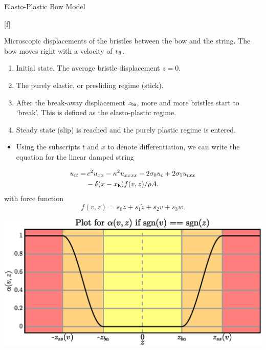 \documentclass[a0paper,portrait]{baposter}
\let\oldtext\text
\renewcommand{\text}[1]{\oldtext{\fontfamily{ptm}\selectfont #1}}
\begin{document}
\begin{poster}
\begin{posterbox}[name=elasto,column=0,below=intro]{Elasto-Plastic Bow Model}
\begin{center}
\begin{tikzpicture}[scale=0.84, every node/.style={transform shape}]
    \end{tikzpicture}
    \captionsetup{singlelinecheck=off}
    [f]{%
    Microscopic displacements of the bristles between the bow and the string. The bow moves right with a velocity of $v_\text{B}$.
    \begin{enumerate}[label = \alph*)]
        \item Initial state. The average bristle displacement $z=0$. 
        \item The purely elastic, or presliding regime (stick).
        \item After the break-away displacement $z_\text{ba}$, more and more bristles start to `break'. This is defined as the elasto-plastic regime. 
        \item Steady state (slip) is reached and the purely plastic regime is entered.
    \end{enumerate}
}
    \label{fig:elasto}
    \end{center}
    \begin{itemize}
        \item Using the subscripts $t$ and $x$ to denote differentiation, we can write the equation for the linear damped string
    \end{itemize}
    \begin{equation}
\begin{aligned}
  u_{tt} = &\, c^2u_{xx}-\kappa^2u_{xxxx}-2\sigma_0u_t+2\sigma_1u_{txx}\\
  &-\delta(x-x_\text{B})f(v,z)/\rho A.
  \end{aligned}
\end{equation}
with force function
\begin{equation}
    f(v,z) = s_0z+s_1\dot{z}+s_2v+s_3w.
\end{equation}

    \begin{center}
  \includegraphics[width=0.9\columnwidth]{drawAlpha3.eps}
  \label{fig:alpha}
\end{center}
\end{posterbox}



\end{poster}
\end{document}
